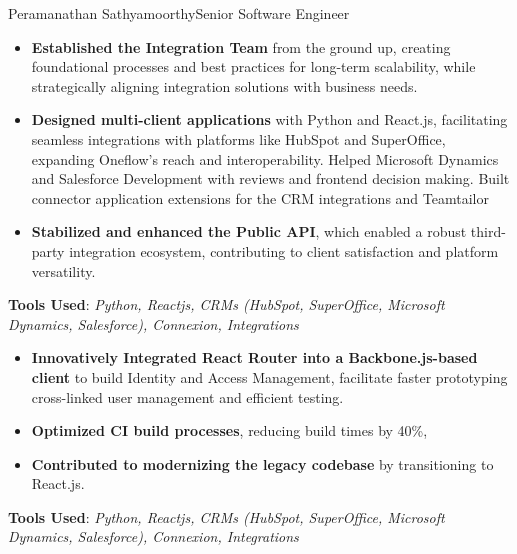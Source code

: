 \documentclass{article}
\begin{document}
\begin{cv}[cvpicture]{Peramanathan Sathyamoorthy}{Senior Software Engineer}
\begin{cvevent}[March 2019][September 2021]
    \begin{itemize}
       \setlength{\itemsep}{0.2em}
       \item \textbf{Established the Integration Team} from the ground up, creating foundational processes and best practices for long-term scalability, while strategically aligning integration solutions with business needs.
       \item \textbf{Designed multi-client applications} with Python and React.js, facilitating seamless integrations with platforms like HubSpot and SuperOffice, expanding Oneflow’s reach and interoperability.
        Helped Microsoft Dynamics and Salesforce Development with reviews and frontend decision making.
        Built connector application extensions for the CRM integrations and Teamtailor
        \item \textbf{Stabilized and enhanced the Public API}, which enabled a robust third-party integration ecosystem, contributing to client satisfaction and platform versatility.
    \end{itemize}
\end{cvevent}
\vspace{1em}
\textbf{Tools Used}: \textit{Python, Reactjs, CRMs (HubSpot, SuperOffice, Microsoft Dynamics, Salesforce), Connexion, Integrations}
\vspace{1em}

\begin{cvevent}[April 2017][February 2019]
    \begin{itemize}
       \setlength{\itemsep}{0.2em}
       \item \textbf{Innovatively Integrated React Router into a Backbone.js-based client} to build Identity and Access Management, facilitate faster prototyping cross-linked user management and efficient testing.
       \item \textbf{Optimized CI build processes}, reducing build times by 40\%,
       \item \textbf{Contributed to modernizing the legacy codebase} by transitioning to React.js.
    \end{itemize}
\end{cvevent}
\vspace{1em}
\textbf{Tools Used}: \textit{Python, Reactjs, CRMs (HubSpot, SuperOffice, Microsoft Dynamics, Salesforce), Connexion, Integrations}
\vspace{1em}


\end{cv}
\end{document}
